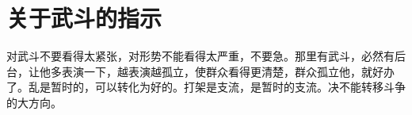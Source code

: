 \section[关于武斗的指示（一九六七年八月）]{关于武斗的指示}


对武斗不要看得太紧张，对形势不能看得太严重，不要急。那里有武斗，必然有后台，让他多表演一下，越表演越孤立，使群众看得更清楚，群众孤立他，就好办了。乱是暂时的，可以转化为好的。打架是支流，是暂时的支流。决不能转移斗争的大方向。


